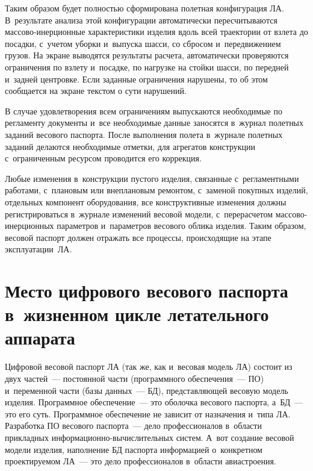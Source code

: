 \begin{multicols}{2}
  Таким образом будет полностью сформирована полетная конфигурация ЛА. 
В~результате анализа этой конфигурации автоматически пересчитываются  
мас\-со\-во-инер\-ци\-он\-ные характеристики изделия вдоль всей траектории от 
взлета до посадки, с~учетом уборки и~выпуска шасси, со сбросом 
и~передвижением грузов. На экране выводятся результаты расчета, 
автоматически проверяются ограничения по взлету и~посадке, по нагрузке на 
стойки шасси, по передней и~задней центровке. Если заданные ограничения 
нарушены, то об этом сообщается на экране текстом о сути нарушений.
  
  В случае удовлетворения всем ограничениям выпускаются необходимые по 
регламенту документы и~все необходимые данные заносятся в~журнал 
полетных заданий весового паспорта. После выполнения полета в~журнале 
полетных заданий делаются необходимые отметки, для агрегатов конструкции 
с~ограниченным ресурсом проводится его коррекция.

  
  Любые изменения в~конструкции пустого из\-делия, связанные 
с~регламентными работами, %
с~плановым или внеплановым ремонтом, с~заменой 
покуп\-ных изделий, отдельных компонент обору\-до\-ва\-ния, все конструктивные 
изменения должны регистрироваться в~журнале изменений весовой модели, 
с~перерасчетом мас\-со\-во-инер\-ци\-он\-ных параметров и~параметров 
весового облика изделия. Таким образом, весовой паспорт должен отражать все 
процессы, происходящие на этапе эксплуатации~ЛА.

\vspace*{-6pt}

\section{Место цифрового весового паспорта в~жизненном цикле 
летательного аппарата}

\vspace*{-2pt}

  Цифровой весовой паспорт ЛА (так же, как и~весовая модель ЛА) состоит из 
двух частей~--- постоянной час\-ти (программного обеспечения~--- ПО) 
и~переменной час\-ти (базы данных~--- БД), пред\-став\-ля\-ющей весовую модель 
изделия. Программное обеспечение~--- это оболочка весового паспорта, а~БД~--- это его суть. 
Программное обеспечение не 
зависит от назначения и~типа ЛА. Разработка 
ПО весового паспорта~--- дело профессионалов в~об\-ласти прикладных  
ин\-фор\-ма\-ци\-он\-но-вы\-чис\-ли\-тель\-ных сис\-тем. А~вот создание весовой 
модели изделия, наполнение БД паспорта информацией о~конкретном 
проектируемом ЛА~--- это дело профессионалов в~об\-ласти авиастроения. 
  

\end{multicols}
